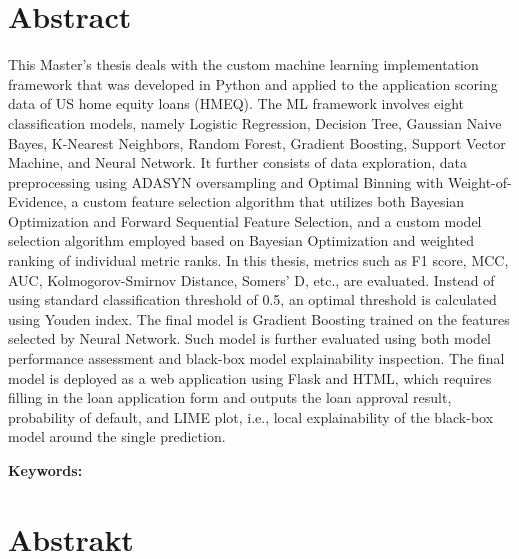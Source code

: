 \section*{Abstract}


This Master's thesis deals with the custom machine learning implementation framework that was developed in Python and applied to the application scoring data of US home equity loans (HMEQ).
The ML framework involves eight classification models, namely Logistic Regression, Decision Tree, Gaussian Naive Bayes, K-Nearest Neighbors, Random Forest, Gradient Boosting, Support Vector Machine, and Neural Network.
It further consists of data exploration, data preprocessing using ADASYN oversampling and Optimal Binning with Weight-of-Evidence, a custom feature selection algorithm that utilizes both Bayesian Optimization and Forward Sequential Feature Selection, and a custom model selection algorithm employed based on Bayesian Optimization and weighted ranking of individual metric ranks. In this thesis, metrics such as F1 score, MCC, AUC, Kolmogorov-Smirnov Distance, Somers' D, etc., are evaluated.
Instead of using standard classification threshold of 0.5, an optimal threshold is calculated using Youden index.
The final model is Gradient Boosting trained on the features selected by Neural Network. 
Such model is further evaluated using both model performance assessment and black-box model explainability inspection.
The final model is deployed as a web application using Flask and HTML, which requires filling in the loan application form and outputs the loan approval result, probability of default, and LIME plot, i.e., local explainability of the black-box model around the single prediction.
\bigskip

\textbf{Keywords:} \Keywords


\bigskip

\newpage
\section*{Abstrakt}\label{abstract}


